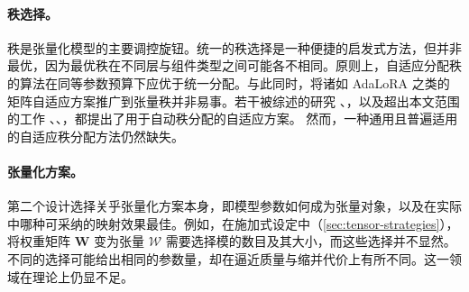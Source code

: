 \documentclass[11pt]{article}
\newcommand{\ten}[1]{\mathcal{#1}}
\newcommand{\mat}[1]{\mathbf{#1}}
\newcommand{\set}[1]{\mathrm{#1}}
\begin{document}
\paragraph{秩选择。}

秩是张量化模型的主要调控旋钮。统一的秩选择是一种便捷的启发式方法，但并非最优，因为最优秩在不同层与组件类型之间可能各不相同。原则上，自适应分配秩的算法在同等参数预算下应优于统一分配。与此同时，将诸如 AdaLoRA \cite{zhang2023adalora} 之类的矩阵自适应方案推广到张量秩并非易事。若干被综述的研究 \cite{yang2024comera}、\cite{lopezpiqueres2025metatt}，以及超出本文范围的工作 \cite{hawkins2019rankselection1}、\cite{hawkins2021rankselection2}、\cite{gu2022heat}，都提出了用于自动秩分配的自适应方案。
然而，一种通用且普遍适用的自适应秩分配方法仍然缺失。


\paragraph{张量化方案。}

第二个设计选择关乎张量化方案本身，即模型参数如何成为张量对象，以及在实际中哪种可采纳的映射效果最佳。例如，在施加式设定中（\cref{sec:tensor-strategies}），将权重矩阵 $\mat{W}$ 变为张量 $\ten{W}$ 需要选择模的数目及其大小，而这些选择并不显然。不同的选择可能给出相同的参数量，却在逼近质量与缩并代价上有所不同。这一领域在理论上仍显不足。
\end{document}
